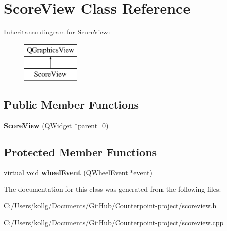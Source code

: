 \hypertarget{class_score_view}{}\section{Score\+View Class Reference}
\label{class_score_view}
Inheritance diagram for Score\+View\+:\begin{figure}[H]
\begin{center}
\leavevmode
\includegraphics[height=2.000000cm]{class_score_view}
\end{center}
\end{figure}
\subsection*{Public Member Functions}
\begin{DoxyCompactItemize}
\item 
\hypertarget{class_score_view_a4bdafcdab114a507f0cef34ae23d23f3}{}{\bfseries Score\+View} (Q\+Widget $\ast$parent=0)\label{class_score_view_a4bdafcdab114a507f0cef34ae23d23f3}

\end{DoxyCompactItemize}
\subsection*{Protected Member Functions}
\begin{DoxyCompactItemize}
\item 
\hypertarget{class_score_view_a86954c336f05821fa615ba0f037dd16a}{}virtual void {\bfseries wheel\+Event} (Q\+Wheel\+Event $\ast$event)\label{class_score_view_a86954c336f05821fa615ba0f037dd16a}

\end{DoxyCompactItemize}


The documentation for this class was generated from the following files\+:\begin{DoxyCompactItemize}
\item 
C\+:/\+Users/kollg/\+Documents/\+Git\+Hub/\+Counterpoint-\/project/scoreview.\+h\item 
C\+:/\+Users/kollg/\+Documents/\+Git\+Hub/\+Counterpoint-\/project/scoreview.\+cpp\end{DoxyCompactItemize}
